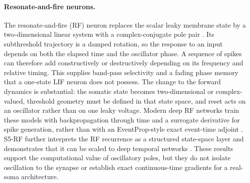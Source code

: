 \paragraph{Resonate-and-fire neurons.}
The resonate-and-fire (RF) neuron replaces the scalar leaky membrane state by a two-dimensional linear system with a complex-conjugate pole pair \cite{izhikevich2001resonate}. Its subthreshold trajectory is a damped rotation, so the response to an input depends on both the elapsed time and the oscillator phase. A sequence of spikes can therefore add constructively or destructively depending on its frequency and relative timing. This supplies band-pass selectivity and a fading phase memory that a one-state LIF neuron does not possess. The change to the forward dynamics is substantial: the somatic state becomes two-dimensional or complex-valued, threshold geometry must be defined in that state space, and reset acts on an oscillator rather than on one leaky voltage. Modern deep RF networks train these models with backpropagation through time and a surrogate derivative for spike generation, rather than with an EventProp-style exact event-time adjoint \cite{alkhamissi2021deeprf,huber2025s5rf}. S5-RF further interprets the RF recurrence as a structured state-space layer and demonstrates that it can be scaled to deep temporal networks \cite{huber2025s5rf}. These results support the computational value of oscillatory poles, but they do not isolate oscillation to the synapse or establish exact continuous-time gradients for a real-soma architecture.

